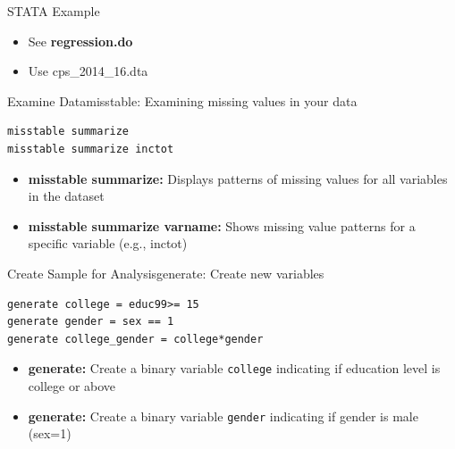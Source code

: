 \documentclass[dvipsnames,hyperref={pdfpagelabels=false}]{beamer}
\begin{document}





\date
{}


\begin{frame}{}
	\titlepage
\end{frame}






\begin{frame}{STATA Example}{}
	\begin{itemize}
		\item See \textbf{regression.do}
		\vspace{0.2cm}
		\item Use cps\_2014\_16.dta
		\vspace{0.2cm}
		
	\end{itemize}
\end{frame}



\begin{frame}[fragile]{Examine Data}{misstable: Examining missing values in your data}
\begin{lstlisting}
misstable summarize
misstable summarize inctot
\end{lstlisting}
		\vspace{0.2cm}
	\begin{itemize}
		\item \textbf{misstable summarize:} Displays patterns of missing values for all variables in the dataset
		\vspace{0.2cm}
		\item \textbf{misstable summarize varname:} Shows missing value patterns for a specific variable (e.g., inctot)
		
	\end{itemize}
\end{frame}


\begin{frame}[fragile]{Create Sample for Analysis}{generate: Create new variables}
\begin{lstlisting}
generate college = educ99>= 15
generate gender = sex == 1
generate college_gender = college*gender
\end{lstlisting}
		\vspace{0.2cm}
	\begin{itemize}
	\item \textbf{generate:} Create a binary variable \texttt{college} indicating if education level is college or above
	\vspace{0.2cm}
		\item \textbf{generate:} Create a binary variable \texttt{gender} indicating if gender is male (sex=1)

		
	\end{itemize}
\end{frame}
\end{document}
